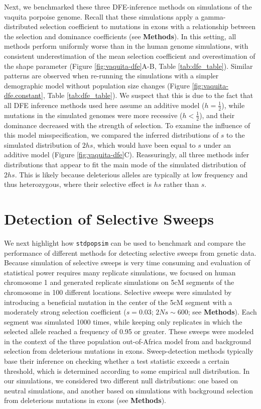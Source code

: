 \documentclass[hidelinks]{article}
\newcommand{\stdpopsim}{\texttt{stdpopsim}\xspace}
\begin{document}
    Next, we benchmarked these three DFE-inference methods on simulations of the vaquita porpoise genome.
    Recall that these simulations apply a gamma-distributed selection coefficient to mutations in exons
    with a relationship between the selection and dominance coefficients (see \textbf{Methods}).
    In this setting, all methods perform uniformly worse than in the human genome simulations,
    with consistent underestimation of the mean selection coefficient    
    and overestimation of the shape parameter (Figure \ref{fig:vaquita-dfe}A-B, Table \ref{tab:dfe_table}). 
    Similar patterns are observed when re-running the simulations with a simpler demographic model
    without population size changes (Figure \ref{fig:vaquita-dfe.constant}, Table \ref{tab:dfe_table}).
    We suspect that this is due to the fact that all DFE inference methods used here assume an additive model ($h = \frac{1}{2}$),
    while mutations in the simulated genomes were more recessive ($h < \frac{1}{2}$), and their dominance decreased with the strength of selection. 
    To examine the influence of this model misspecification, we compared the inferred distributions of $s$ to the 
    simulated distribution of $2hs$, which would have been equal to $s$ under an additive model (Figure \ref{fig:vaquita-dfe}C).
    Reassuringly, all three methods infer distributions that appear to fit the main mode of the simulated distribution of $2hs$.
    This is likely because deleterious alleles are typically at low frequency and thus heterozygous, 
    where their selective effect is $h s$ rather than $s$.

\section*{Detection of Selective Sweeps}
    \label{sweeps}
    We next highlight how \stdpopsim can be used to benchmark and compare
    the performance of different methods for detecting selective sweeps from genetic data.
    Because simulation of selective sweeps is very time consuming and evaluation of statistical power requires
    many replicate simulations, we focused on human chromosome 1 and generated replicate simulations on 5cM segments
    of the chromosome in 100 different locations. %
    Selective sweeps were simulated by introducing a beneficial mutation in the center of the 5cM segment
    with a moderately strong selection coefficient ($s = 0.03$; $2Ns \sim 600$; see \textbf{Methods}).
    Each segment was simulated 1000 times, while keeping only replicates in which the selected allele reached a frequency of 0.95 or greater.
    These sweeps were modeled in the context of the three population out-of-Africa model from \citet{gutenkunst2009inferring}
    and background selection from deleterious mutations in exons.
    Sweep-detection methods typically base their inference on checking whether a test statistic
    exceeds a certain threshold, which is determined according to some empirical null distribution.
    In our simulations, we considered two different null distributions:
    one based on neutral simulations, and another based on simulations with background selection
    from deleterious mutations in exons (see \textbf{Methods}).
  
\end{document}
